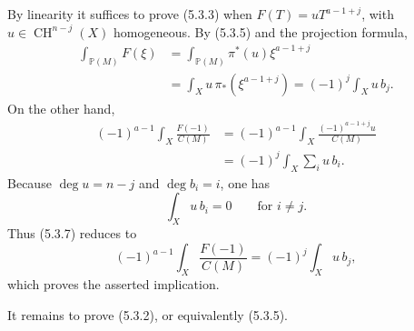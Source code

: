 By linearity it suffices to prove (5.3.3) when
$F(T)=uT^{a-1+j}$, with $u\in\operatorname{CH}^{n-j}(X)$
homogeneous.  By (5.3.5) and the projection formula,
\begin{equation}\tag{5.3.6}
\begin{aligned}
\int_{\mathbb P(M)}F(\xi)
&=\int_{\mathbb P(M)}\pi^*(u)\xi^{a-1+j}\\
&=\int_Xu\,\pi_*(\xi^{a-1+j})
=(-1)^j\int_Xu\,b_j.
\end{aligned}
\end{equation}
On the other hand,
\begin{equation}\tag{5.3.7}
\begin{aligned}
(-1)^{a-1}\int_X\frac{F(-1)}{C(M)}
&=(-1)^{a-1}\int_X
  \frac{(-1)^{a-1+j}u}{C(M)}\\
&=(-1)^j\int_X\sum_i u\,b_i.
\end{aligned}
\end{equation}
Because $\deg u=n-j$ and $\deg b_i=i$, one has
\[
\int_Xu\,b_i=0\qquad\text{for }i\ne j.
\]
Thus (5.3.7) reduces to
\begin{equation}\tag{5.3.8}
(-1)^{a-1}\int_X\frac{F(-1)}{C(M)}
=(-1)^j\int_Xu\,b_j,
\end{equation}
which proves the asserted implication.

It remains to prove (5.3.2), or equivalently (5.3.5).

